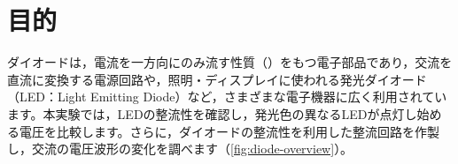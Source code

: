 \graphicspath{{contents/03_diode/figures/}}


\section{目的}

ダイオードは，電流を一方向にのみ流す性質（）をもつ電子部品であり，交流を直流に変換する電源回路や，照明・ディスプレイに使われる発光ダイオード（LED：Light Emitting Diode）など，さまざまな電子機器に広く利用されています。本実験では，LEDの整流性を確認し，発光色の異なるLEDが点灯し始める電圧を比較します。さらに，ダイオードの整流性を利用した整流回路を作製し，交流の電圧波形の変化を調べます（\cref{fig:diode-overview}）。

